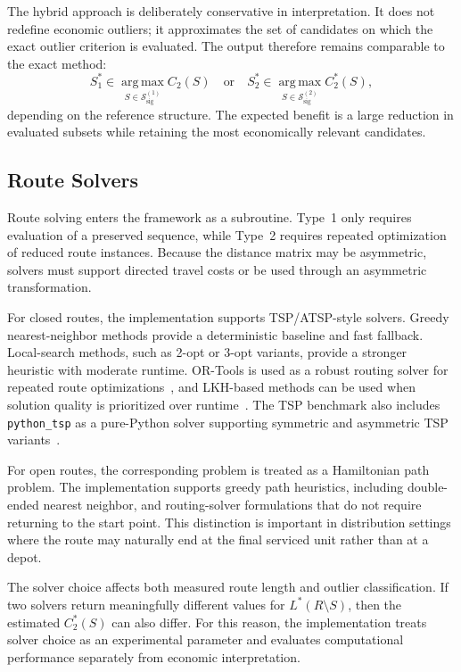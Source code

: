 \documentclass[preprint,12pt]{elsarticle}
\begin{document}
The hybrid approach is deliberately conservative in interpretation. It does not redefine economic outliers; it approximates the set of candidates on which the exact outlier criterion is evaluated. The output therefore remains comparable to the exact method:
\[
S_1^*\in\operatorname*{arg\,max}_{S\in \mathcal{S}_{\mathrm{sig}}^{(1)}} C_2(S)
\quad \text{or} \quad
S_2^*\in\operatorname*{arg\,max}_{S\in \mathcal{S}_{\mathrm{sig}}^{(2)}} C_2^*(S),
\]
depending on the reference structure. The expected benefit is a large reduction in evaluated subsets while retaining the most economically relevant candidates.

\subsection{Route Solvers}
\label{subsec:route-solvers}

Route solving enters the framework as a subroutine. Type~1 only requires evaluation of a preserved sequence, while Type~2 requires repeated optimization of reduced route instances. Because the distance matrix may be asymmetric, solvers must support directed travel costs or be used through an asymmetric transformation.

For closed routes, the implementation supports TSP/ATSP-style solvers. Greedy nearest-neighbor methods provide a deterministic baseline and fast fallback. Local-search methods, such as 2-opt or 3-opt variants, provide a stronger heuristic with moderate runtime. OR-Tools is used as a robust routing solver for repeated route optimizations~\cite{ortools_routing}, and LKH-based methods can be used when solution quality is prioritized over runtime~\cite{helsgaun2000lkh}. The TSP benchmark also includes \texttt{python\_tsp} as a pure-Python solver supporting symmetric and asymmetric TSP variants~\cite{goulart2024python_tsp}.

For open routes, the corresponding problem is treated as a Hamiltonian path problem. The implementation supports greedy path heuristics, including double-ended nearest neighbor, and routing-solver formulations that do not require returning to the start point. This distinction is important in distribution settings where the route may naturally end at the final serviced unit rather than at a depot.

The solver choice affects both measured route length and outlier classification. If two solvers return meaningfully different values for $L^*(R\setminus S)$, then the estimated $C_2^*(S)$ can also differ. For this reason, the implementation treats solver choice as an experimental parameter and evaluates computational performance separately from economic interpretation.
\end{document}
